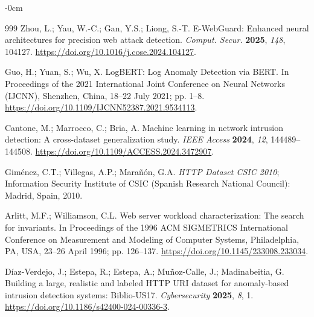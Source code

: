 \documentclass[futureinternet,article,accept,moreauthors]{Definitions/mdpi}
\begin{document}
\begin{adjustwidth}{-\extralength}{0cm}
\begin{thebibliography}{999}
Zhou, L.; Yau, W.-C.; Gan, Y.S.; Liong, S.-T. E-WebGuard: Enhanced neural architectures for precision web attack detection. \emph{Comput. Secur.} \textbf{2025}, \emph{148}, 104127. \url{https://doi.org/10.1016/j.cose.2024.104127}.

Guo, H.; Yuan, S.; Wu, X. LogBERT: Log Anomaly Detection via BERT. In Proceedings of the 2021 International Joint Conference on Neural Networks (IJCNN), Shenzhen, China, 18--22 July 2021; pp. 1--8. \url{https://doi.org/10.1109/IJCNN52387.2021.9534113}.

Cantone, M.; Marrocco, C.; Bria, A. Machine learning in network intrusion detection: A cross-dataset generalization study. \emph{IEEE Access} \textbf{2024}, \emph{12}, 144489--144508. \url{https://doi.org/10.1109/ACCESS.2024.3472907}.

Gim\'{e}nez, C.T.; Villegas, A.P.; Mara\~{n}\'{o}n, G.A. \emph{HTTP Dataset CSIC 2010}; Information Security Institute of CSIC (Spanish Research National Council): Madrid, Spain, 2010.

Arlitt, M.F.; Williamson, C.L. Web server workload characterization: The search for invariants. In Proceedings of the 1996 ACM SIGMETRICS International Conference on Measurement and Modeling of Computer Systems, Philadelphia, PA, USA, 23--26 April 1996; pp. 126--137. \url{https://doi.org/10.1145/233008.233034}.

D\'{i}az-Verdejo, J.; Estepa, R.; Estepa, A.; Mu\~{n}oz-Calle, J.; Madinabeitia, G. Building a large, realistic and labeled HTTP URI dataset for anomaly-based intrusion detection systems: Biblio-US17. \emph{Cybersecurity} \textbf{2025}, \emph{8}, 1. \url{https://doi.org/10.1186/s42400-024-00336-3}.

\end{thebibliography}
\PublishersNote{}
\end{adjustwidth}
\end{document}
